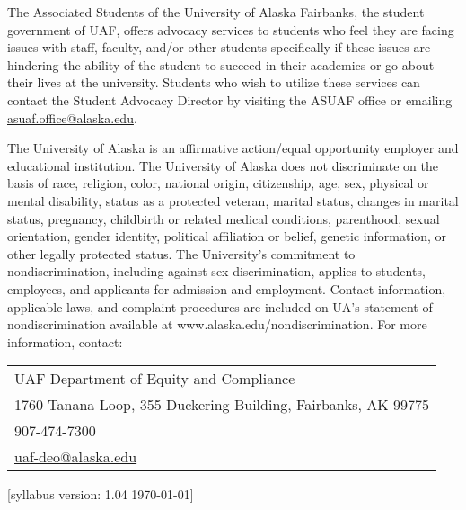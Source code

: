 \documentclass[12pt]{article}
\def\mailto#1{\href{mailto:#1}{#1}}
\begin{document}
The Associated Students of the University of Alaska Fairbanks, the student government of UAF, offers advocacy services to students who feel they are facing issues with staff, faculty, and/or other students specifically if these issues are hindering the ability of the student to succeed in their academics or go about their lives at the university. Students who wish to utilize these services can contact the Student Advocacy Director by visiting the ASUAF office or emailing \mailto{asuaf.office@alaska.edu}.

The University of Alaska is an affirmative action/equal opportunity employer and educational institution. The University of Alaska does not discriminate on the basis of race, religion, color, national origin, citizenship, age, sex, physical or mental disability, status as a protected veteran, marital status, changes in marital status, pregnancy, childbirth or related medical conditions, parenthood, sexual orientation, gender identity, political affiliation or belief, genetic information, or other legally protected status. The University's commitment to nondiscrimination, including against sex discrimination, applies to students, employees, and applicants for admission and employment. Contact information, applicable laws, and complaint procedures are included on UA's statement of nondiscrimination available at www.alaska.edu/nondiscrimination. For more information, contact:

\begin{tabular}{l}
UAF Department of Equity and Compliance\\
1760 Tanana Loop, 355 Duckering Building, Fairbanks, AK  99775\\
907-474-7300\\
\mailto{uaf-deo@alaska.edu}
\end{tabular}


\hfill  \scriptsize [syllabus version: 1.04 \today] \normalsize
\end{document}
